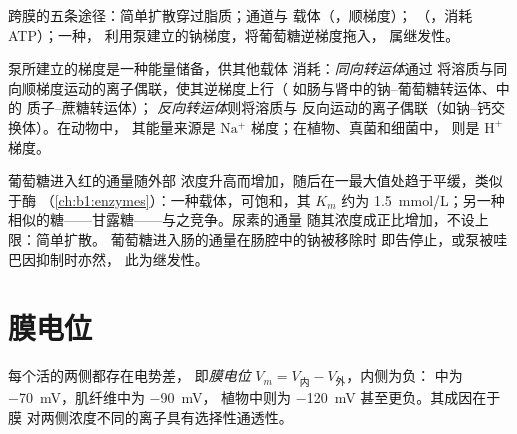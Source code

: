 \begin{omfigure}
{\small 跨膜的五条途径：简单扩散穿过脂质；通道与
载体（，顺梯度）；
（，消耗 ATP）；一种，
利用泵建立的钠梯度，将葡萄糖逆梯度拖入，
属继发性。}
\end{omfigure}

\begin{proposition}[继发性主动运输]\label{prop:b1:membranes-transport:secondary}
泵所建立的梯度是一种能量储备，供其他载体
消耗：\emph{同向转运体}通过
将溶质与同向顺梯度运动的离子偶联，使其逆梯度上行（
如肠与肾中的钠–葡萄糖转运体、中的
质子–蔗糖转运体）；
\emph{反向转运体}则将溶质与
反向运动的离子偶联（如钠–钙交换体）。在动物中，
其能量来源是 $\mathrm{Na^+}$ 梯度；在植物、真菌和细菌中，
则是 $\mathrm{H^+}$ 梯度。
\end{proposition}

\begin{example}[动力学揭示机制]\label{ex:b1:membranes-transport:kinetics}
葡萄糖进入红的通量随外部
浓度升高而增加，随后在一最大值处趋于平缓，类似于酶
（\cref{ch:b1:enzymes}）：一种载体，可饱和，其 $K_m$ 约为
\qty{1.5}{mmol/L}；另一种相似的糖——甘露糖——与之竞争。尿素的通量
随其浓度成正比增加，不设上限：简单扩散。
葡萄糖进入肠的通量在肠腔中的钠被移除时
即告停止，或泵被哇巴因抑制时亦然，
此为继发性。
\end{example}

\section{膜电位}

\begin{definition}[膜电位]\label{def:b1:membranes-transport:potential}
每个活的两侧都存在电势差，
即\emph{膜电位} $V_m = V_{\text{内}} - V_{\text{外}}$，内侧为负：
中为 \qty{-70}{mV}，肌纤维中为 \qty{-90}{mV}，
植物中则为 \qty{-120}{mV} 甚至更负。其成因在于膜
对两侧浓度不同的离子具有选择性通透性。
\end{definition}

